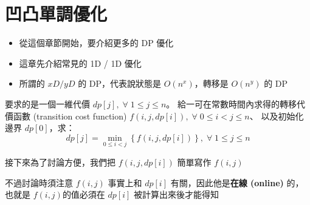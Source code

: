 \documentclass[standalone]{beamer}
\begin{document}
\section{凹凸單調優化}

\begin{frame}{}
  \begin{itemize}
    \item 從這個章節開始，要介紹更多的 DP 優化
    \item 這章先介紹常見的 1D / 1D 優化
    \item 所謂的 $xD/yD$ 的 DP，代表說狀態是 $O(n^x)$，轉移是 $O(n^y)$ 的 DP
  \end{itemize}
\end{frame}

\begin{frame}{}
  \begin{theorem}[1D/1D 常見形式]
  要求的是一個一維代價 $dp[j], \;\forall\; 1\leq j\leq n$。
  給一可在常數時間內求得的轉移代價函數 (transition cost function) $f(i,j,dp[i]), \;\forall\; 0\leq i<j\leq n$、
  以及初始化邊界 $dp[0]$，求：
  \[ dp[j] = \min_{0\leq i<j}\left\{f(i,j,dp[i])\right\}, \;\forall\; 1\leq j \leq n \]
  \end{theorem}
  接下來為了討論方便，我們把 $f(i,j,dp[i])$ 簡單寫作 $f(i,j)$

  不過討論時須注意 $f(i,j)$ 事實上和 $dp[i]$ 有關，因此他是\textbf{在線 (online)} 的，也就是 $f(i,j)$的值必須在 $dp[i]$ 被計算出來後才能得知
\end{frame}
\end{document}
